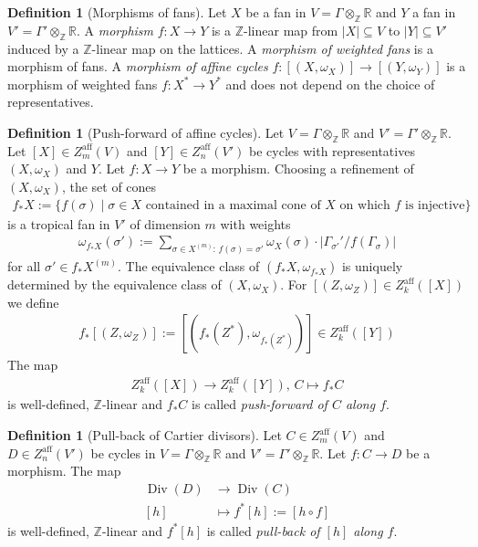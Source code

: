 \documentclass[11pt,reqno,a4]{amsart}
\theoremstyle{dotless}
\theoremstyle{definition}
\newtheorem{definition}[corollary]{Definition}
\begin{document}
\begin{definition}[Morphisms of fans]
Let $X$ be a fan in $V=\Gamma\otimes_{\mathbb{Z}}\mathbb{R}$ and $Y$ a fan in $V'=\Gamma'\otimes_{\mathbb{Z}}\mathbb{R}$. A \textit{morphism} $f:X\to Y$ is a $\mathbb{Z}$-linear map from $|X|\subseteq V$ to $|Y|\subseteq V'$ induced by a $\mathbb{Z}$-linear map on the lattices. A \textit{morphism of weighted fans} is a morphism of fans. A \textit{morphism of affine cycles} $f:[(X,\omega_X)]\to [(Y,\omega_Y)]$ is a morphism of weighted fans $f:X^*\to Y^*$ and does not depend on the choice of representatives.
\end{definition}

\begin{definition}[Push-forward of affine cycles]
Let $V=\Gamma\otimes_{\mathbb{Z}}\mathbb{R}$ and $V'=\Gamma'\otimes_{\mathbb{Z}}\mathbb{R}$. Let $[X]\in Z^{\textrm{aff}}_m(V)$ and $[Y]\in Z^{\textrm{aff}}_n(V')$ be cycles with representatives $(X,\omega_X)$ and $Y$. Let $f:X\to Y$ be a morphism. Choosing a refinement of $(X,\omega_X)$, the set of cones
\begin{align*}
f_*X:=\{f(\sigma)\mid \sigma\in X \textrm{ contained in a maximal cone of $X$ on which $f$ is injective} \}
\end{align*}
is a tropical fan in $V'$ of dimension $m$ with weights
\begin{align*}
\omega_{f_*X}(\sigma'):=\sum_{\sigma\in X^{(m)}: \, f(\sigma)=\sigma'} \omega_X(\sigma)\cdot |\Gamma_{\sigma'}'/f(\Gamma_\sigma)|
\end{align*}
for all $\sigma'\in f_*X^{(m)}$. The equivalence class of $(f_*X,\omega_{f_*X})$ is uniquely determined by the equivalence class of $(X,\omega_X)$.
For $[(Z,\omega_Z)]\in Z^{\textrm{aff}}_k([X])$ we define
\begin{align*}
f_*[(Z,\omega_Z)]:=[(f_*(Z^*),\omega_{f_*(Z^*)})]\in Z^{\textrm{aff}}_k([Y])
\end{align*}
The map
\begin{align*}
Z^{\textrm{aff}}_k([X])\to Z^{\textrm{aff}}_k([Y]), \, C\mapsto f_*C
\end{align*}
is well-defined, $\mathbb{Z}$-linear and $f_*C$ is called \textit{push-forward of $C$ along $f$}.
\end{definition}

\begin{definition}[Pull-back of Cartier divisors]
Let $C\in Z^{\textrm{aff}}_m(V)$ and $D\in Z^{\textrm{aff}}_n(V')$ be cycles in $V=\Gamma\otimes_{\mathbb{Z}}\mathbb{R}$ and $V'=\Gamma'\otimes_{\mathbb{Z}}\mathbb{R}$. Let $f:C\to D$ be a morphism. The map
\begin{align*}
\operatorname{Div}(D)&\to\operatorname{Div}(C)\\
[h]&\mapsto f^*[h]:=[h\circ f]
\end{align*}
is well-defined, $\mathbb{Z}$-linear and $f^*[h]$ is called \textit{pull-back of $[h]$ along $f$}.
\end{definition}
\end{document}
